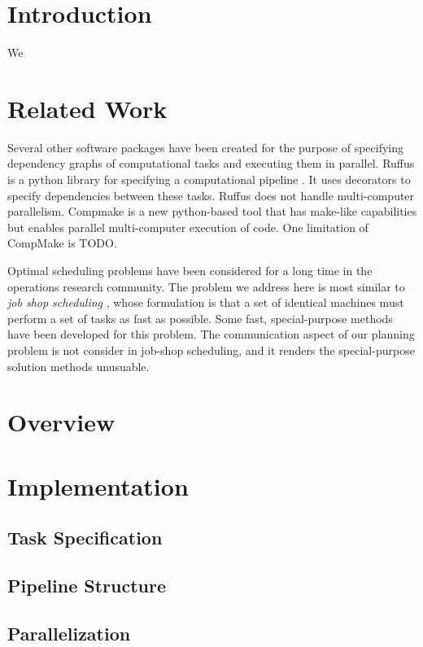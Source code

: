 \documentclass[letterpaper, 10 pt, conference]{ieeeconf}  %
\begin{document}
\section{Introduction}
We 

\section{Related Work}
Several other software packages have been created for the purpose of specifying dependency graphs of computational tasks and executing them in parallel.
Ruffus is a python library for specifying a computational pipeline \cite{goodstadt2010ruffus}.
It uses decorators to specify dependencies between these tasks.
Ruffus does not handle multi-computer parallelism.
Compmake \cite{censicompmake} is a new python-based tool that has make-like capabilities but enables parallel multi-computer execution of code.
One limitation of CompMake is TODO.

Optimal scheduling problems have been considered for a long time in the operations research community.
The problem we address here is most similar to \textit{job shop scheduling} \cite{yamada1997job}, whose formulation is that a set of identical machines must perform a set of tasks as fast as possible.
Some fast, special-purpose methods have been developed for this problem.
The communication aspect of our planning problem is not consider in job-shop scheduling, and it renders the special-purpose solution methods unusuable.


\section{Overview}
\section{Implementation}
\subsection{Task Specification}
\subsection{Pipeline Structure}

\subsection{Parallelization}
\end{document}
